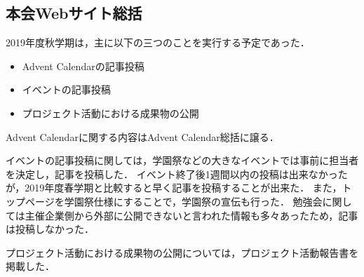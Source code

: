 \subsection*{本会Webサイト総括}


2019年度秋学期は，主に以下の三つのことを実行する予定であった．
\begin{itemize}
  \item Advent Calendarの記事投稿
  \item イベントの記事投稿
  \item プロジェクト活動における成果物の公開
\end{itemize}

Advent Calendarに関する内容はAdvent Calendar総括に譲る．

イベントの記事投稿に関しては，学園祭などの大きなイベントでは事前に担当者を決定し，記事を投稿した．
イベント終了後1週間以内の投稿は出来なかったが，2019年度春学期と比較すると早く記事を投稿することが出来た．
また，トップページを学園祭仕様にすることで，学園祭の宣伝も行った．
勉強会に関しては主催企業側から外部に公開できないと言われた情報も多々あったため，記事は投稿しなかった．

プロジェクト活動における成果物の公開については，プロジェクト活動報告書を掲載した．
